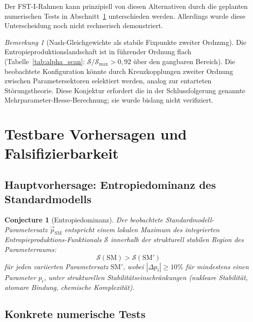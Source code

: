 \documentclass[12pt,a4paper]{article}
\newtheorem{conjecture}{Conjecture}
\theoremstyle{remark}
\newtheorem{remark}{Bemerkung}
\begin{document}
Der FST-I-Rahmen kann prinzipiell von diesen Alternativen durch die geplanten numerischen Tests in Abschnitt~\ref{sec:predictions} unterschieden werden. Allerdings wurde diese Unterscheidung noch nicht rechnerisch demonstriert.

\begin{remark}[Nash-Gleichgewichte als stabile Fixpunkte zweiter Ordnung]
\label{rem:degenerate-perturbation}
Die Entropieproduktionslandschaft ist in f\"uhrender Ordnung flach (Tabelle~\ref{tab:alpha_scan}: $\mathcal{S}/\mathcal{S}_{\max} > 0{,}92$ \"uber den gangbaren Bereich). Die beobachtete Konfiguration k\"onnte durch Kreuzkopplungen zweiter Ordnung zwischen Parametersektoren selektiert werden, analog zur entarteten St\"orungstheorie. Diese Konjektur erfordert die in der Schlussfolgerung genannte Mehrparameter-Hesse-Berechnung; sie wurde bislang nicht verifiziert.
\end{remark}

\section{Testbare Vorhersagen und Falsifizierbarkeit}
\label{sec:predictions}

\subsection{Hauptvorhersage: Entropiedominanz des Standardmodells}

\begin{conjecture}[Entropiedominanz]
\label{conj:entropy-dominance}
Der beobachtete Standardmodell-Parametersatz $\vec{p}_{\mathrm{SM}}$ entspricht einem lokalen Maximum des integrierten Entropieproduktions-Funktionals $\mathcal{S}$ innerhalb der strukturell stabilen Region des Parameterraums:
\begin{equation}
\mathcal{S}(\mathrm{SM}) > \mathcal{S}(\mathrm{SM}')
\end{equation}
f\"ur jeden variierten Parametersatz $\mathrm{SM}'$, wobei $|\Delta p_i| \geq 10\%$ f\"ur mindestens einen Parameter $p_i$, unter strukturellen Stabilit\"atseinschr\"ankungen (nukleare Stabilit\"at, atomare Bindung, chemische Komplexit\"at).
\end{conjecture}

\subsection{Konkrete numerische Tests}
\end{document}

